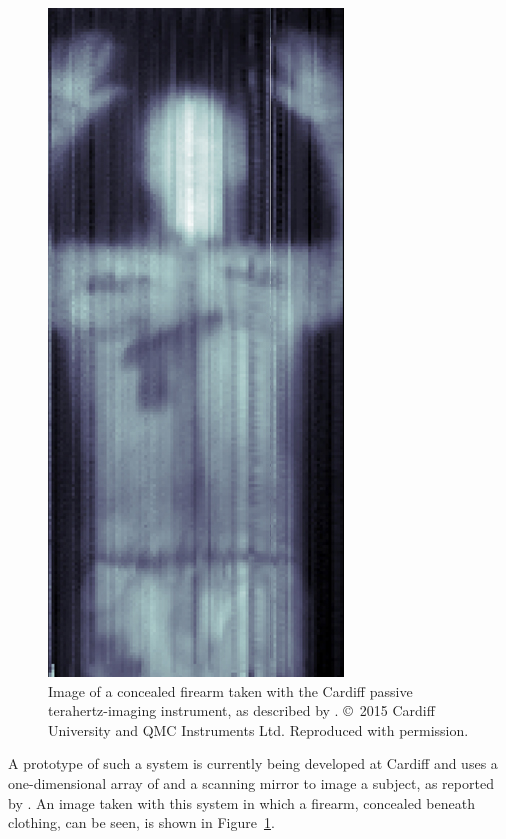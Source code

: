 \begin{figure}[tb]
\begin{center}
\includegraphics[height = 0.4\textheight]{figures/kidCAM_image}
\caption[Image of a concealed firearm taken with the Cardiff passive terahertz-imaging instrument]{Image of a concealed firearm taken with the Cardiff passive terahertz-imaging instrument, as described by \textcite{Rowe2015}. \copyright~2015 Cardiff University and QMC Instruments Ltd. Reproduced with permission.}
\label{fig:KIDcam}
\end{center}
\end{figure}
A prototype of such a system is currently being developed at Cardiff and uses a one-dimensional array of  and a scanning mirror to image a subject, as reported by \textcite{Rowe2015}. An image taken with this system in which a firearm, concealed beneath clothing, can be seen, is shown in Figure~\ref{fig:KIDcam}.
%

